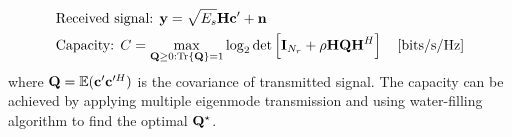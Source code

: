 \begin{itemize}
    \begin{align}
        &\text{Received signal: } {\bf y} = \sqrt{E_s} {\bf H} {\bf c}' + {\bf n}\\
        &\text{Capacity: } C = \max_{{\bf Q} \ge 0: \mathrm{Tr}\{{\bf Q}\}=1} \log_2 \det\left[ {\bf I}_{N_r} + \rho {\bf HQH}^H\right] \quad [\mathrm{bits/s/Hz}]
    \end{align}
    where ${\bf Q} = \mathbb{E}({\bf c}'{\bf c}'^H)$ is the covariance of transmitted signal. The capacity can be achieved by applying 
    multiple eigenmode transmission and using water-filling algorithm to find the optimal ${\bf Q}^\star$.

\end{itemize}

